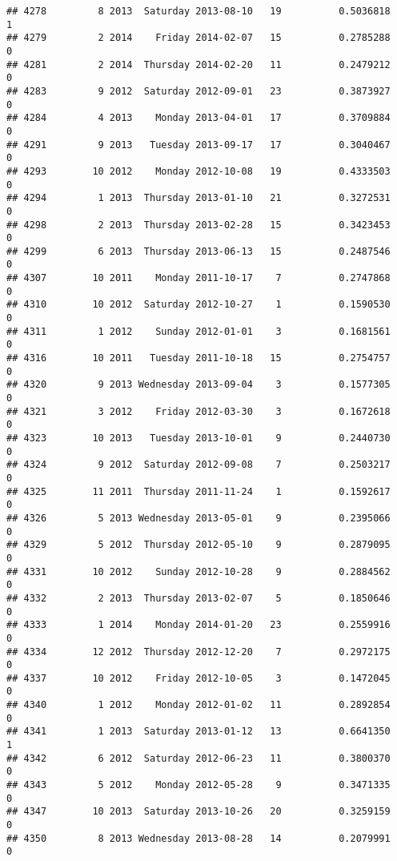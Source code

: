\documentclass[
]{article}
\begin{document}
\begin{verbatim}
## 4278         8 2013  Saturday 2013-08-10   19          0.5036818             1
## 4279         2 2014    Friday 2014-02-07   15          0.2785288             0
## 4281         2 2014  Thursday 2014-02-20   11          0.2479212             0
## 4283         9 2012  Saturday 2012-09-01   23          0.3873927             0
## 4284         4 2013    Monday 2013-04-01   17          0.3709884             0
## 4291         9 2013   Tuesday 2013-09-17   17          0.3040467             0
## 4293        10 2012    Monday 2012-10-08   19          0.4333503             0
## 4294         1 2013  Thursday 2013-01-10   21          0.3272531             0
## 4298         2 2013  Thursday 2013-02-28   15          0.3423453             0
## 4299         6 2013  Thursday 2013-06-13   15          0.2487546             0
## 4307        10 2011    Monday 2011-10-17    7          0.2747868             0
## 4310        10 2012  Saturday 2012-10-27    1          0.1590530             0
## 4311         1 2012    Sunday 2012-01-01    3          0.1681561             0
## 4316        10 2011   Tuesday 2011-10-18   15          0.2754757             0
## 4320         9 2013 Wednesday 2013-09-04    3          0.1577305             0
## 4321         3 2012    Friday 2012-03-30    3          0.1672618             0
## 4323        10 2013   Tuesday 2013-10-01    9          0.2440730             0
## 4324         9 2012  Saturday 2012-09-08    7          0.2503217             0
## 4325        11 2011  Thursday 2011-11-24    1          0.1592617             0
## 4326         5 2013 Wednesday 2013-05-01    9          0.2395066             0
## 4329         5 2012  Thursday 2012-05-10    9          0.2879095             0
## 4331        10 2012    Sunday 2012-10-28    9          0.2884562             0
## 4332         2 2013  Thursday 2013-02-07    5          0.1850646             0
## 4333         1 2014    Monday 2014-01-20   23          0.2559916             0
## 4334        12 2012  Thursday 2012-12-20    7          0.2972175             0
## 4337        10 2012    Friday 2012-10-05    3          0.1472045             0
## 4340         1 2012    Monday 2012-01-02   11          0.2892854             0
## 4341         1 2013  Saturday 2013-01-12   13          0.6641350             1
## 4342         6 2012  Saturday 2012-06-23   11          0.3800370             0
## 4343         5 2012    Monday 2012-05-28    9          0.3471335             0
## 4347        10 2013  Saturday 2013-10-26   20          0.3259159             0
## 4350         8 2013 Wednesday 2013-08-28   14          0.2079991             0

\end{verbatim}
\end{document}
